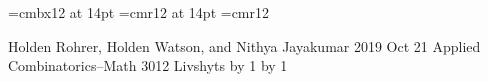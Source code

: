 \def\link#1{%
  \pdfstartlink
    user{/Subtype /Link
    /Border [ 0 0 0 ]
    /A <<
      /Type /Action
      /S /URI
      /URI (#1)
    >>}%
    {\it #1}%
  \pdfendlink
}

\font\fourteenbf=cmbx12 at 14pt
\font\fourteenrm=cmr12 at 14pt
\font\twelverm=cmr12

{\obeylines\parindent=0in
Holden Rohrer, Holden Watson, and Nithya Jayakumar
2019 Oct 21
Applied Combinatorics--Math 3012
Livshyts
\medskip
}
\def\titlesub#1#2{\centerline{\fourteenbf #1}\centerline{#2}\bigskip}
\newcount\sections \newcount\subsections
\outer\def\section#1\par{\advance\sections by 1}
\def\thesection#1{\vskip .3\hsize\goodbreak\vskip -.3\hsize\bigskip\noindent{\fourteenrm\the\sections\ #1\bigskip}}
\outer\def\subsection#1\par{\advance\subsections by 1}
\def\thesubsection#1{\vskip .15\hsize\goodbreak\vskip -.15\hsize\medskip\noindent{\twelverm\the\sections.\the\subsections\ #1\medskip}}
